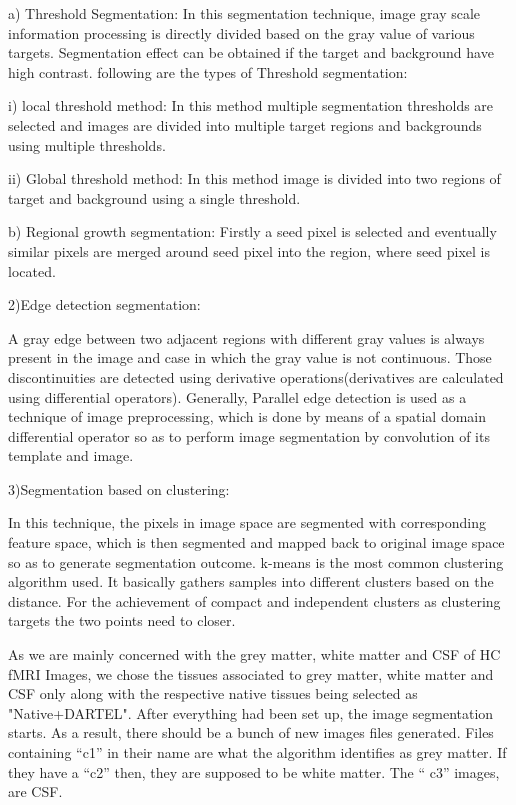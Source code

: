 \documentclass{article}
\begin{document}
a) Threshold Segmentation: In this segmentation technique, image gray
scale information processing is directly divided based on the gray
value of various targets. Segmentation effect can be obtained if the
target and background have high contrast. following are the types of
Threshold segmentation:

i) local threshold method: In this method multiple segmentation
thresholds are selected and images are divided into multiple target
regions and backgrounds using multiple thresholds.

ii) Global threshold method: In this method image is divided into two
regions of target and background using a single threshold.

b) Regional growth segmentation: Firstly a
seed pixel is selected and eventually similar pixels are merged around
seed pixel into the region, where seed pixel is located.

2)Edge detection segmentation:

A gray edge between two adjacent regions with different gray values is
always present in the image and case in which the gray value is not
continuous. Those discontinuities are detected using derivative
operations(derivatives are calculated using differential operators).
Generally, Parallel edge detection is used as a technique of image
preprocessing, which is done by means of a spatial domain differential
operator so as to perform image segmentation by convolution of its
template and image.

3)Segmentation based on clustering:

In this technique, the pixels in image space are segmented with
corresponding feature space, which is then segmented and mapped back
to original image space so as to generate segmentation outcome.
k-means is the most common clustering algorithm used. It basically
gathers samples into different clusters based on the distance. For the
achievement of compact and independent clusters as clustering targets
the two points need to closer.

As we are mainly concerned with the grey matter, white matter and CSF
of HC fMRI Images, we chose the tissues associated to grey matter,
white matter and CSF only along with the respective native tissues
being selected as "Native+DARTEL". After everything had been set up,
the image segmentation starts. As a result, there should be a bunch of
new images files generated. Files containing ``c1'' in their name are
what the algorithm identifies as grey matter. If they have a ``c2''
then, they are supposed to be white matter. The `` c3'' images, are
CSF.
\end{document}
